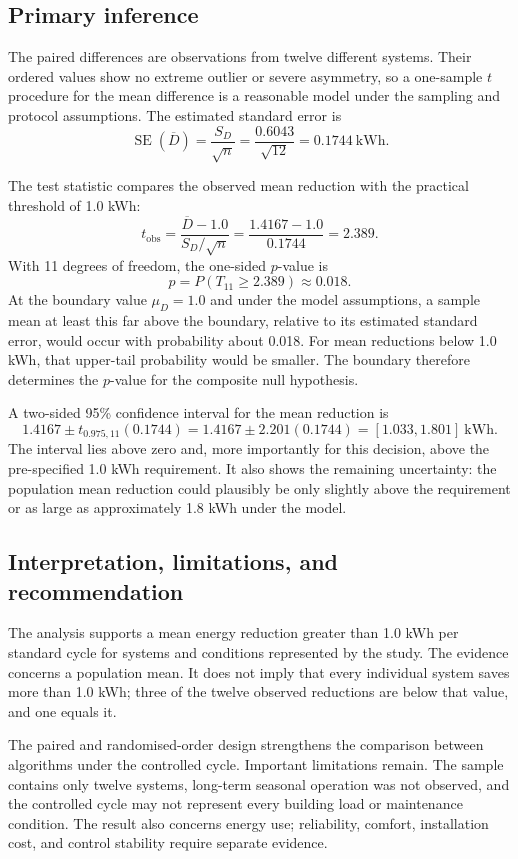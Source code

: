 \subsection{Primary inference}

The paired differences are observations from twelve different systems. Their ordered values show no extreme outlier or severe asymmetry, so a one-sample $t$ procedure for the mean difference is a reasonable model under the sampling and protocol assumptions. The estimated standard error is
\[
\operatorname{SE}(\overline D)
=\frac{S_D}{\sqrt n}
=\frac{0.6043}{\sqrt{12}}
=0.1744\ \text{kWh}.
\]

The test statistic compares the observed mean reduction with the practical threshold of 1.0 kWh:
\[
t_{\mathrm{obs}}
=\frac{\overline D-1.0}{S_D/\sqrt n}
=\frac{1.4167-1.0}{0.1744}
=2.389.
\]
With 11 degrees of freedom, the one-sided $p$-value is
\[
p=P(T_{11}\geq 2.389)\approx0.018.
\]
At the boundary value $\mu_D=1.0$ and under the model assumptions, a sample mean at least this far above the boundary, relative to its estimated standard error, would occur with probability about 0.018. For mean reductions below 1.0 kWh, that upper-tail probability would be smaller. The boundary therefore determines the $p$-value for the composite null hypothesis.

A two-sided 95\% confidence interval for the mean reduction is
\[
1.4167\pm t_{0.975,11}(0.1744)
=1.4167\pm2.201(0.1744)
=[1.033,1.801]\ \text{kWh}.
\]
The interval lies above zero and, more importantly for this decision, above the pre-specified 1.0 kWh requirement. It also shows the remaining uncertainty: the population mean reduction could plausibly be only slightly above the requirement or as large as approximately 1.8 kWh under the model.

\subsection{Interpretation, limitations, and recommendation}

The analysis supports a mean energy reduction greater than 1.0 kWh per standard cycle for systems and conditions represented by the study. The evidence concerns a population mean. It does not imply that every individual system saves more than 1.0 kWh; three of the twelve observed reductions are below that value, and one equals it.

The paired and randomised-order design strengthens the comparison between algorithms under the controlled cycle. Important limitations remain. The sample contains only twelve systems, long-term seasonal operation was not observed, and the controlled cycle may not represent every building load or maintenance condition. The result also concerns energy use; reliability, comfort, installation cost, and control stability require separate evidence.

